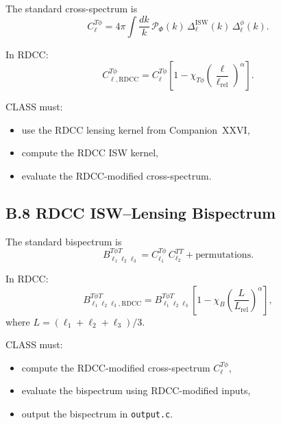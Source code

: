 \documentclass[11pt,a4paper]{article}
\begin{document}
The standard cross-spectrum is
\begin{equation}
    C_{\ell}^{T\phi}
    = 4\pi \int \frac{dk}{k}\,
      \mathcal{P}_{\Phi}(k)\,
      \Delta_{\ell}^{\mathrm{ISW}}(k)\,
      \Delta_{\ell}^{\phi}(k).
\end{equation}

In RDCC:
\begin{equation}
    C_{\ell,\mathrm{RDCC}}^{T\phi}
    = C_{\ell}^{T\phi}
      \left[
        1 - \chi_{T\phi}
        \left(\frac{\ell}{\ell_{\mathrm{rel}}}\right)^{\alpha}
      \right].
\end{equation}

CLASS must:

\begin{itemize}
    \item use the RDCC lensing kernel from Companion~XXVI,
    \item compute the RDCC ISW kernel,
    \item evaluate the RDCC-modified cross-spectrum.
\end{itemize}

\subsection*{B.8 RDCC ISW–Lensing Bispectrum}

The standard bispectrum is
\begin{equation}
    B_{\ell_{1}\ell_{2}\ell_{3}}^{T\phi T}
    = C_{\ell_{1}}^{T\phi}\,C_{\ell_{2}}^{TT}
      + \text{permutations}.
\end{equation}

In RDCC:
\begin{equation}
    B_{\ell_{1}\ell_{2}\ell_{3},\mathrm{RDCC}}^{T\phi T}
    = B_{\ell_{1}\ell_{2}\ell_{3}}^{T\phi T}
      \left[
        1 - \chi_{B}
        \left(\frac{L}{L_{\mathrm{rel}}}\right)^{\alpha}
      \right],
\end{equation}
where $L = (\ell_{1}+\ell_{2}+\ell_{3})/3$.

CLASS must:

\begin{itemize}
    \item compute the RDCC-modified cross-spectrum $C_{\ell}^{T\phi}$,
    \item evaluate the bispectrum using RDCC-modified inputs,
    \item output the bispectrum in \texttt{output.c}.
\end{itemize}
\end{document}
